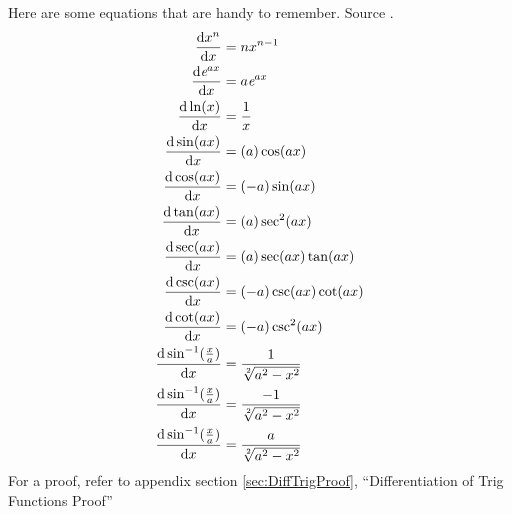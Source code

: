 Here are some equations that are handy to remember. Source \cite{RHBDiffQuickStart}.
\begin{align}
  \frac{\mathrm{d}x^n}{\mathrm{d}x}             & = n{x}^{n-1} \\
  \frac{\mathrm{d}{\emph{e}}^{ax}}{\mathrm{d}x} & = a{\emph{e}}^{ax} \\
  \frac{\mathrm{d}\ln(x)}{\mathrm{d}x}          & = \frac{1}{x} \\
  \frac{\mathrm{d}\sin(ax)}{\mathrm{d}x}        & = (a)\cos(ax) \\
  \frac{\mathrm{d}\cos(ax)}{\mathrm{d}x}        & = (-a)\sin(ax) \\
  \frac{\mathrm{d}\tan(ax)}{\mathrm{d}x}        & = (a)\sec^2(ax) \\
  \frac{\mathrm{d}\sec(ax)}{\mathrm{d}x}        & = (a)\sec(ax)\tan(ax) \\
  \frac{\mathrm{d}\csc(ax)}{\mathrm{d}x}        & = (-a)\csc(ax)\cot(ax) \\
  \frac{\mathrm{d}\cot(ax)}{\mathrm{d}x}        & = (-a)\csc^2(ax) \\
  \frac{\mathrm{d}\sin^{-1}(\frac{x}{a})}{\mathrm{d}x}
    & = \frac{1}{\sqrt[2]{{a}^{2} - {x}^{2}}} \\
  \frac{\mathrm{d}\sin^{-1}(\frac{x}{a})}{\mathrm{d}x}
    & = \frac{-1}{\sqrt[2]{{a}^{2} - {x}^{2}}} \\
  \frac{\mathrm{d}\sin^{-1}(\frac{x}{a})}{\mathrm{d}x}
    & = \frac{a}{\sqrt[2]{{a}^{2} - {x}^{2}}}
\end{align}
For a proof, refer to appendix section \ref{sec:DiffTrigProof},
``Differentiation of Trig Functions Proof''